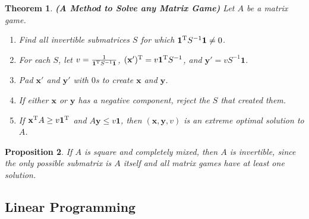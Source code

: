 \documentclass{article}
\theoremstyle{colontheorem}
\newtheorem{theorem}{Theorem}[section]
\newtheorem{proposition}[theorem]{Proposition}
\newcommand{\T}{^\textnormal{T}}
\newenvironment{Theorem}
{
	\begin{mdframed}[backgroundcolor=TheoremOrange!10]
	\begin{theorem}
}
{
	\end{theorem}
	\end{mdframed}
	
	\vspace{.15in}
}
\newenvironment{Proposition}
{
	\begin{mdframed}[backgroundcolor=TheoremOrange!10]
	\begin{proposition}
}
{
	\end{proposition}
	\end{mdframed}
	
	\vspace{.15in}
}
\begin{document}
\begin{Theorem}
	
	\textbf{(A Method to Solve any Matrix Game)} Let $A$ be a matrix game.
	
	\begin{enumerate}
		
		\item Find all invertible submatrices $S$ for which $\mathbf{1}\T S^{-1} \mathbf{1} \neq 0$.
		
		\item For each $S$, let $v = \frac{1}{\mathbf{1}\T S^{-1} \mathbf{1}}$, $(\mathbf{x}')\T = v \mathbf{1}\T S^{-1}$, and $\mathbf{y}' = v S^{-1} \mathbf{1}$.
		
		\item Pad $\mathbf{x}'$ and $\mathbf{y}'$ with $0$s to create $\mathbf{x}$ and $\mathbf{y}$.
		
		\item If either $\mathbf{x}$ or $\mathbf{y}$ has a negative component, reject the $S$ that created them.
		
		\pagebreak
		
		\item If $\mathbf{x}\T A \geq v \mathbf{1}\T$ and $A \mathbf{y} \leq v \mathbf{1}$, then $(\mathbf{x}, \mathbf{y}, v)$ is an extreme optimal solution to $A$.
		
	\end{enumerate}
	
\end{Theorem}



\begin{Proposition}
	
	If $A$ is square and completely mixed, then $A$ is invertible, since the only possible submatrix is $A$ itself and all matrix games have at least one solution.
	
\end{Proposition}





\begin{center}
	\pagebreak
	
	\section{Linear Programming}
	
	\vspace{.1in}
\end{center}
\end{document}
